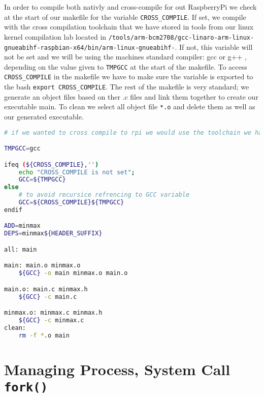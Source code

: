 \documentclass[a4paper,oneside,onecolumn]{article}
\newcommand{\code}[1]{\colorbox{codegray}{\texttt{#1}}}
\begin{document}
\noindent
In order to compile both nativly and cross-compile for out RaspberryPi we check at the start of our makefile for the variable \code{CROSS\_COMPILE}. If set, we compile with the cross compilation toolchain that we have stored in tools from our linux kernel compilation lab located in \texttt{/tools/arm-bcm2708/gcc-linaro-arm-linux-gnueabihf-raspbian-x64/bin/arm-linux-gnueabihf-}. If not, this variable will not be set and we will be using the machines standard compiler: gcc or g++ , depending on the value given to \code{TMPGCC} at the start of the makefile.
\newline
To access \code{CROSS\_COMPILE} in the makefile we have to make sure the variable is exported to the bash \code{export CROSS\_COMPILE}.
\newline
The rest of the makefile is very standard; we generate an object files based on ther .c files and link them together to create our executable main. To clean we select all object file \code{*.o} and delete them as well as our generated executable.

\begin{lstlisting}[language=bash,caption={MinMax Makefile}]
# if we wanted to cross compile to rpi we would use the toolchain we have downloaded for the kernel compilation : arm-linux-gnueabi-gcc, but to use it we would have to specify a path. In our case we have exported the path to the folder in the vaiable CROSS_COMPILE

TMPGCC=gcc

ifeq (${CROSS_COMPILE},'')
    echo "CROSS_COMPILE is not set";
    GCC=${TMPGCC}
else
    # to avoid recursice refrencing to GCC variable
    GCC=${CROSS_COMPILE}${TMPGCC}
endif

ADD=minmax
DEPS=minmax${HEADER_SUFFIX}

all: main

main: main.o minmax.o
	${GCC} -o main minmax.o main.o

main.o: main.c minmax.h
	${GCC} -c main.c

minmax.o: minmax.c minmax.h
	${GCC} -c minmax.c
clean:
	rm -f *.o main
\end{lstlisting}

\section*{Managing Process, System Call \code{fork()}}
\end{document}
